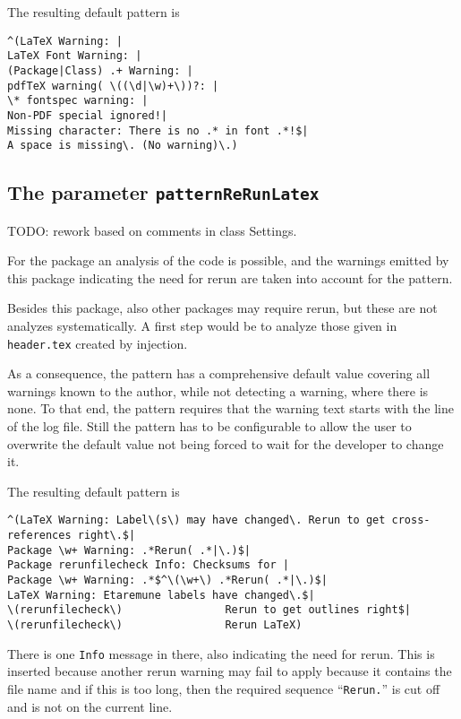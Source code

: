 The resulting default pattern is 
%
\begin{Verbatim}
^(LaTeX Warning: |
LaTeX Font Warning: |
(Package|Class) .+ Warning: |
pdfTeX warning( \((\d|\w)+\))?: |
\* fontspec warning: |
Non-PDF special ignored!|
Missing character: There is no .* in font .*!$|
A space is missing\. (No warning)\.)
\end{Verbatim}


\subsection{The parameter \texttt{patternReRunLatex}}%
\label{subsec:patternReRunLatex}

TODO\@: rework based on comments in class Settings. 

For the package  an analysis of the code is possible, 
and the warnings emitted by this package indicating the need for rerun 
are taken into account for the pattern. 

Besides this package, also other packages may require rerun, 
but these are not analyzes systematically. 
A first step would be to analyze those given in \texttt{header.tex} 
created by injection. %

As a consequence, the pattern has a comprehensive default value 
covering all warnings known to the author, 
while not detecting a warning, where there is none. 
To that end, the pattern requires 
that the warning text starts with the line of the log file. 
Still the pattern has to be configurable 
to allow the user to overwrite the default value 
not being forced to wait for the developer to change it. 


The resulting default pattern is 
%
\begin{Verbatim}[fontsize=\scriptsize]
^(LaTeX Warning: Label\(s\) may have changed\. Rerun to get cross-references right\.$|
Package \w+ Warning: .*Rerun( .*|\.)$|
Package rerunfilecheck Info: Checksums for |
Package \w+ Warning: .*$^\(\w+\) .*Rerun( .*|\.)$|
LaTeX Warning: Etaremune labels have changed\.$|
\(rerunfilecheck\)                Rerun to get outlines right$|
\(rerunfilecheck\)                Rerun LaTeX)
\end{Verbatim}

There is one \texttt{Info} message in there, also indicating the need for rerun. 
This is inserted because another rerun warning may fail to apply 
because it contains the file name and if this is too long, 
then the required sequence ``\texttt{Rerun.}'' is cut off 
and is not on the current line. 

